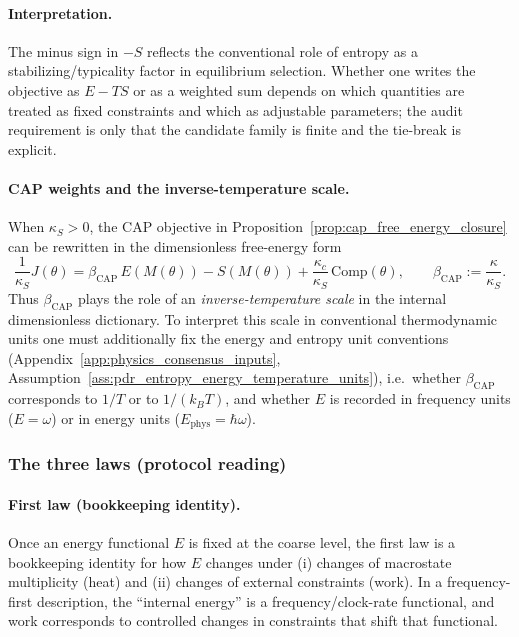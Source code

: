 \paragraph{Interpretation.}
\InterfaceTag The minus sign in $-S$ reflects the conventional role of entropy as a stabilizing/typicality factor in equilibrium selection.
Whether one writes the objective as $E-TS$ or as a weighted sum depends on which quantities are treated as fixed constraints and which as adjustable parameters; the audit requirement is only that the candidate family is finite and the tie-break is explicit.

\paragraph{CAP weights and the inverse-temperature scale.}
\InterfaceTag When $\kappa_S>0$, the CAP objective in Proposition~\ref{prop:cap_free_energy_closure} can be rewritten in the dimensionless free-energy form
\[
\frac{1}{\kappa_S}J(\theta)=\beta_{\mathrm{CAP}}\,E(M(\theta)) - S(M(\theta)) + \frac{\kappa_c}{\kappa_S}\,\mathrm{Comp}(\theta),
\qquad
\beta_{\mathrm{CAP}}:=\frac{\kappa}{\kappa_S}.
\]
Thus $\beta_{\mathrm{CAP}}$ plays the role of an \emph{inverse-temperature scale} in the internal dimensionless dictionary.
To interpret this scale in conventional thermodynamic units one must additionally fix the energy and entropy unit conventions (Appendix~\ref{app:physics_consensus_inputs}, Assumption~\ref{ass:pdr_entropy_energy_temperature_units}), i.e.\ whether $\beta_{\mathrm{CAP}}$ corresponds to $1/T$ or to $1/(k_B T)$, and whether $E$ is recorded in frequency units ($E=\omega$) or in energy units ($E_{\mathrm{phys}}=\hbar\omega$).

\subsubsection{The three laws (protocol reading)}
\label{subsec:three_laws_protocol}

\paragraph{First law (bookkeeping identity).}
\InterfaceTag Once an energy functional $E$ is fixed at the coarse level, the first law is a bookkeeping identity for how $E$ changes under (i) changes of macrostate multiplicity (heat) and (ii) changes of external constraints (work).
In a frequency-first description, the ``internal energy'' is a frequency/clock-rate functional, and work corresponds to controlled changes in constraints that shift that functional.

